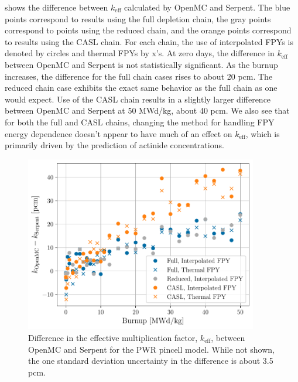 \documentclass[3p,authoryear]{elsarticle}
\begin{document}
 shows the difference between $k_\text{eff}$ calculated by
OpenMC and Serpent. The blue points correspond to results using the full
depletion chain, the gray points correspond to points using the reduced chain,
and the orange points correspond to results using the CASL chain. For each
chain, the use of interpolated FPYs is denoted by circles and thermal FPYs by
x's. At zero days, the difference in $k_\text{eff}$ between OpenMC and Serpent
is not statistically significant. As the burnup increases, the difference for
the full chain cases rises to about 20 pcm. The reduced chain case exhibits the
exact same behavior as the full chain as one would expect. Use of the CASL chain
results in a slightly larger difference between OpenMC and Serpent at 50 MWd/kg,
about 40 pcm. We also see that for both the full and CASL chains, changing the
method for handling FPY energy dependence doesn't appear to have much of an
effect on $k_\text{eff}$, which is primarily driven by the prediction of
actinide concentrations.
\begin{figure}[H]
  \centering
  \includegraphics[width=4in]{figures/pwr_keff.pdf}
  \caption{Difference in the effective multiplication factor, $k_\text{eff}$,
  between OpenMC and Serpent for the PWR pincell model. While not shown, the one
  standard deviation uncertainty in the difference is about 3.5 pcm.}
  \label{fig:pwr-keff}
\end{figure}
\end{document}
